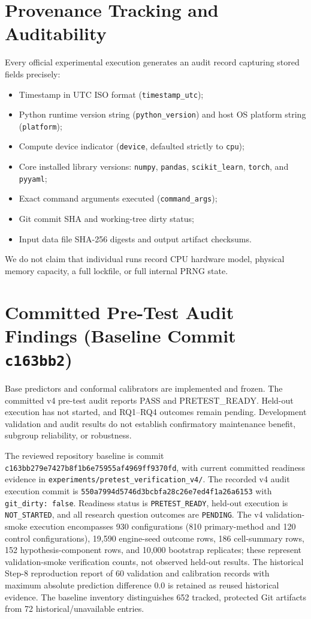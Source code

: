 \section{Provenance Tracking and Auditability}
Every official experimental execution generates an audit record capturing stored fields precisely:
\begin{itemize}
    \item Timestamp in UTC ISO format (\texttt{timestamp\_utc});
    \item Python runtime version string (\texttt{python\_version}) and host OS platform string (\texttt{platform});
    \item Compute device indicator (\texttt{device}, defaulted strictly to \texttt{cpu});
    \item Core installed library versions: \texttt{numpy}, \texttt{pandas}, \texttt{scikit\_learn}, \texttt{torch}, and \texttt{pyyaml};
    \item Exact command arguments executed (\texttt{command\_args});
    \item Git commit SHA and working-tree dirty status;
    \item Input data file SHA-256 digests and output artifact checksums.
\end{itemize}
We do not claim that individual runs record CPU hardware model, physical memory capacity, a full lockfile, or full internal PRNG state.

\section{Committed Pre-Test Audit Findings (Baseline Commit \texttt{c163bb2})}
Base predictors and conformal calibrators are implemented and frozen. The committed v4 pre-test audit reports PASS and PRETEST\_READY. Held-out execution has not started, and RQ1–RQ4 outcomes remain pending. Development validation and audit results do not establish confirmatory maintenance benefit, subgroup reliability, or robustness.

The reviewed repository baseline is commit \texttt{c163bb279e7427b8f1b6e75955af4969ff9370fd}, with current committed readiness evidence in \texttt{experiments/pretest\_verification\_v4/}. The recorded v4 audit execution commit is \texttt{550a7994d5746d3bcbfa28c26e7ed4f1a26a6153} with \texttt{git\_dirty: false}. Readiness status is \texttt{PRETEST\_READY}, held-out execution is \texttt{NOT\_STARTED}, and all research question outcomes are \texttt{PENDING}. The v4 validation-smoke execution encompasses 930 configurations (810 primary-method and 120 control configurations), 19,590 engine-seed outcome rows, 186 cell-summary rows, 152 hypothesis-component rows, and 10,000 bootstrap replicates; these represent validation-smoke verification counts, not observed held-out results. The historical Step-8 reproduction report of 60 validation and calibration records with maximum absolute prediction difference 0.0 is retained as reused historical evidence. The baseline inventory distinguishes 652 tracked, protected Git artifacts from 72 historical/unavailable entries.

